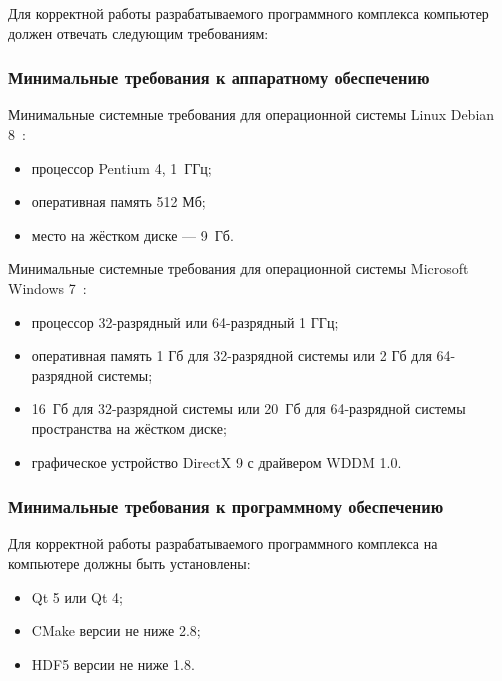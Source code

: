 Для корректной работы разрабатываемого программного комплекса компьютер должен отвечать следующим требованиям:
\subsubsection {Минимальные требования к аппаратному обеспечению}
Минимальные системные требования для операционной системы Linux Debian 8~\cite{debian_8}:

\begin{itemize}
\item процессор Pentium 4, 1~ГГц;
\item оперативная память 512 Мб;
\item место на жёстком диске --- 9~Гб.
\end{itemize}

Минимальные системные требования для операционной системы Microsoft Windows 7~\cite{windows_7}:

\begin{itemize}
\item процессор 32-разрядный или 64-разрядный 1 ГГц;
\item оперативная память 1 Гб для 32-разрядной системы или 2 Гб для 64-разрядной системы;
\item 16~Гб для 32-разрядной системы или 20~Гб для 64-разрядной системы пространства на жёстком диске;
\item графическое устройство DirectX 9 с драйвером WDDM 1.0.

\end{itemize}

\subsubsection {Минимальные требования к программному обеспечению}
Для корректной работы разрабатываемого программного комплекса на компьютере должны быть установлены:
\begin{itemize}
\item Qt 5 или Qt 4;
\item CMake версии не ниже 2.8;
\item HDF5 версии не ниже 1.8.
\end{itemize}
